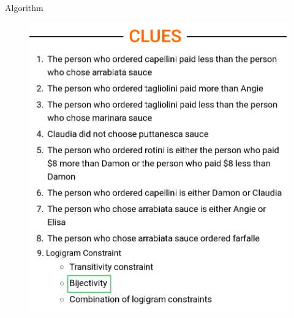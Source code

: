 \documentclass{beamer}
\begin{document}
\begin{frame}{Algorithm}
{\begin{minipage}[t]{0.40\textwidth}
\begin{figure}[h]
                \includegraphics[width=\textwidth]{figures/clue_bijectivity.png}
                \label{clues}
            \end{figure}

        \end{minipage}

    }


\end{frame}
\end{document}
